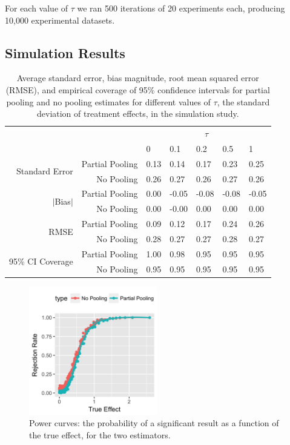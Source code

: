 \documentclass{edm_template}
\begin{document}
For each value of $\tau$ we ran 500 iterations of 20 experiments each, producing 10,000 experimental datasets.

\subsection{Simulation Results}
\begin{table}
\centering
\begin{tabular}{rrlllll}
&&\multicolumn{5}{c}{$\tau$}\\
&&0&0.1&0.2&0.5&1\\
\hline
\multirow{2}{*}{ Standard Error }& Partial Pooling & 0.13&0.14&0.17&0.23&0.25 \\ 
& No Pooling & 0.26&0.27&0.26&0.27&0.26 \\ 
\hline\multirow{2}{*}{ $|$Bias$|$ }& Partial Pooling & 0.00&-0.05&-0.08&-0.08&-0.05 \\ 
& No Pooling & 0.00&-0.00&0.00&0.00&0.00 \\ 
\hline\multirow{2}{*}{ RMSE }& Partial Pooling & 0.09&0.12&0.17&0.24&0.26 \\ 
& No Pooling & 0.28&0.27&0.27&0.28&0.27 \\ 
\hline\multirow{2}{*}{ 95\% CI Coverage }& Partial Pooling & 1.00&0.98&0.95&0.95&0.95 \\ 
& No Pooling & 0.95&0.95&0.95&0.95&0.95 \\ 
\hline
\end{tabular}
\caption{Average standard error, bias magnitude, root mean squared error (RMSE), and empirical coverage of 95\% confidence intervals for partial pooling and no pooling estimates for different values of $\tau$, the standard deviation of treatment effects, in the simulation study.}
\label{tab:simRes1}
\end{table}

\begin{figure}
\centering
\includegraphics[width=0.5\textwidth]{reject.jpg}
\caption{Power curves: the probability of a significant result as a function of the true effect, for the two estimators.}
\label{fig:power}
\end{figure}
\end{document}
